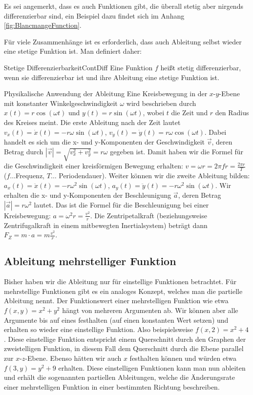 Es sei angemerkt, dass es auch Funktionen gibt, die überall stetig aber nirgends differenzierbar sind, ein Beispiel dazu findet sich im Anhang \ref{fig:BlancmangeFunction}.

Für viele Zusammenhänge ist es erforderlich, dass auch Ableitung selbst wieder eine stetige Funktion ist. Man definiert daher:

\begin{definition}{Stetige Differenzierbarkeit}{ContDiff}
    Eine Funktion $f$ heißt stetig differenzierbar, wenn sie differenzierbar ist und ihre Ableitung eine stetige Funktion ist.
\end{definition}

\begin{example}{Physikalische Anwendung der Ableitung}{}
    Eine Kreisbewegung in der $x$-$y$-Ebene mit konstanter Winkelgeschwindigkeit $\omega$ wird beschrieben durch $x(t) = r \cos(\omega t)$ und $y(t) = r \sin(\omega t)$, wobei $t$ die Zeit und $r$ den Radius des Kreises meint. Die erste Ableitung nach der Zeit lautet $v_x(t) = \dot{x}(t) = -r \omega \sin(\omega t)$, $v_y(t) = \dot{y}(t) = r \omega \cos(\omega t)$. Dabei handelt es sich um die x- und y-Komponenten der Geschwindigkeit $\vec v$, deren Betrag durch $|\vec v| = \sqrt{v_x^2+v_y^2} = r \omega$ gegeben ist. Damit haben wir die Formel für die Geschwindigkeit einer kreisförmigen Bewegung erhalten: $v = \omega r = 2\pi f r = \frac{2\pi r}{T}$ ($f\dots$Frequenz, $T\dots$ Periodendauer). Weiter können wir die zweite Ableitung bilden: $a_x(t) = \ddot{x}(t) = -r\omega^2 \sin(\omega t)$, $a_y(t) = \ddot{y}(t) = -r \omega^2 \sin(\omega t)$. Wir erhalten die x- und y-Komponenten der Beschleunigung $\vec a$, deren Betrag $|\vec a| = r \omega^2$ lautet. Das ist die Formel für die Beschleunigung bei einer Kreisbewegung: $a = \omega^2 r = \frac{v^2}{r}$. Die Zentripetalkraft (beziehungsweise Zentrifugalkraft in einem mitbewegten Inertialsystem) beträgt dann $F_Z = m \cdot a = m \frac{v^2}{r}$.
\end{example}

\subsection{Ableitung mehrstelliger Funktion}

Bisher haben wir die Ableitung nur für einstellige Funktionen betrachtet. Für mehrstellige Funktionen gibt es ein analoges Konzept, welches man die partielle Ableitung nennt. Der Funktionswert einer mehrstelligen Funktion wie etwa $f(x,y) = x^2+y^2$ hängt von mehreren Argumenten ab. Wir können aber alle Argumente bis auf eines festhalten (auf einen konstanten Wert setzen) und erhalten so wieder eine einstellige Funktion. Also beispielsweise $f(x,2) = x^2+4$. Diese einstellige Funktion entspricht einem Querschnitt durch den Graphen der zweistelligen Funktion, in diesem Fall dem Querschnitt durch die Ebene parallel zur $x$-$z$-Ebene. Ebenso hätten wir auch $x$ festhalten können und würden etwa $f(3, y) = y^2+9$ erhalten. Diese einstelligen Funktionen kann man nun ableiten und erhält die sogenannten partiellen Ableitungen, welche die Änderungsrate einer mehrstelligen Funktion in einer bestimmten Richtung beschreiben.

